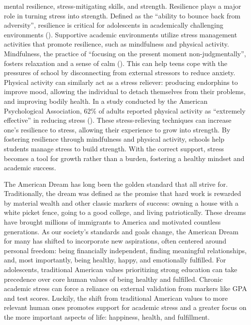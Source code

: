 \documentclass[12pt, a4paper, twoside]{article}
\begin{document}
mental resilience, stress-mitigating skills, and strength. Resilience plays a major role in turning stress into strength. Defined as the “ability to bounce back from adversity”, resilience is critical for adolescents in academically challenging environments (\cite{claney2023}). Supportive academic environments utilize stress management activities that promote resilience, such as mindfulness and physical activity. Mindfulness, the practice of “focusing on the present moment non-judgmentally”, fosters relaxation and a sense of calm (\cite{claney2023}). This can help teens cope with the pressures of school by disconnecting from external stressors to reduce anxiety. Physical activity can similarly act as a stress reliever: producing endorphins to improve mood, allowing the individual to detach themselves from their problems, and improving bodily health. In a study conducted by the American Psychological Association, 62\% of adults reported physical activity as “extremely effective” in reducing stress (\cite{apa2014stress}). These stress-relieving techniques can increase one’s resilience to stress, allowing their experience to grow into strength. By fostering resilience through mindfulness and physical activity, schools help students manage stress to build strength. With the correct support, stress becomes a tool for growth rather than a burden, fostering a healthy mindset and academic success. 

The American Dream has long been the golden standard that all strive for. Traditionally, the dream was defined as the promise that hard work is rewarded by material wealth and other classic markers of success: owning a house with a white picket fence, going to a good college, and living patriotically. These dreams have brought millions of immigrants to America and motivated countless generations. As our society’s standards and goals change, the American Dream for many has shifted to incorporate new aspirations, often centered around personal freedom: being financially independent, finding meaningful relationships, and, most importantly, being healthy, happy, and emotionally fulfilled. For adolescents, traditional American values prioritizing strong education can take precedence over core human values of being healthy and fulfilled. Chronic academic stress can force a reliance on external validation from markers like GPA and test scores. Luckily, the shift from traditional American values to more relevant human ones promotes support for academic stress and a greater focus on the more important aspects of life: happiness, health, and fulfillment.


\printbibliography
\end{document}
